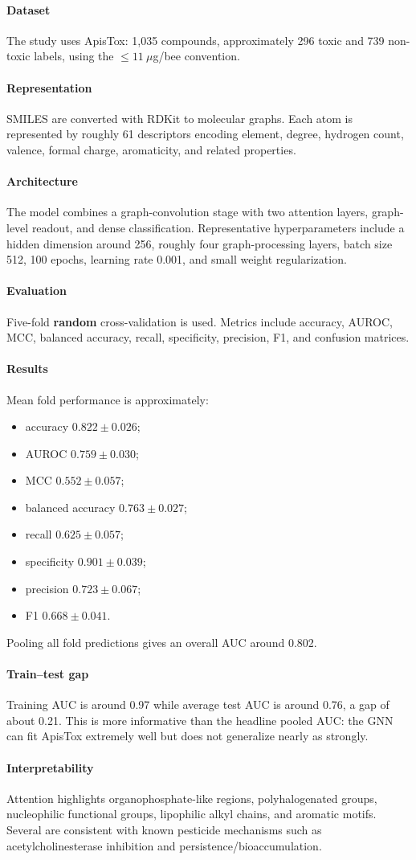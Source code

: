 \documentclass[11pt]{article}
\newcommand{\reviewfield}[2]{\paragraph{#1}#2}
\begin{document}
\reviewfield{Dataset}{
The study uses ApisTox: 1,035 compounds, approximately 296 toxic and 739 non-toxic labels, using the $\leq11~\mu$g/bee convention.
}

\reviewfield{Representation}{
SMILES are converted with RDKit to molecular graphs. Each atom is represented by roughly 61 descriptors encoding element, degree, hydrogen count, valence, formal charge, aromaticity, and related properties.
}

\reviewfield{Architecture}{
The model combines a graph-convolution stage with two attention layers, graph-level readout, and dense classification. Representative hyperparameters include a hidden dimension around 256, roughly four graph-processing layers, batch size 512, 100 epochs, learning rate 0.001, and small weight regularization.
}

\reviewfield{Evaluation}{
Five-fold \textbf{random} cross-validation is used. Metrics include accuracy, AUROC, MCC, balanced accuracy, recall, specificity, precision, F1, and confusion matrices.
}

\reviewfield{Results}{
Mean fold performance is approximately:
\begin{itemize}
    \item accuracy $0.822\pm0.026$;
    \item AUROC $0.759\pm0.030$;
    \item MCC $0.552\pm0.057$;
    \item balanced accuracy $0.763\pm0.027$;
    \item recall $0.625\pm0.057$;
    \item specificity $0.901\pm0.039$;
    \item precision $0.723\pm0.067$;
    \item F1 $0.668\pm0.041$.
\end{itemize}
Pooling all fold predictions gives an overall AUC around 0.802.
}

\reviewfield{Train--test gap}{
Training AUC is around 0.97 while average test AUC is around 0.76, a gap of about 0.21. This is more informative than the headline pooled AUC: the GNN can fit ApisTox extremely well but does not generalize nearly as strongly.
}

\reviewfield{Interpretability}{
Attention highlights organophosphate-like regions, polyhalogenated groups, nucleophilic functional groups, lipophilic alkyl chains, and aromatic motifs. Several are consistent with known pesticide mechanisms such as acetylcholinesterase inhibition and persistence/bioaccumulation.
}
\end{document}
